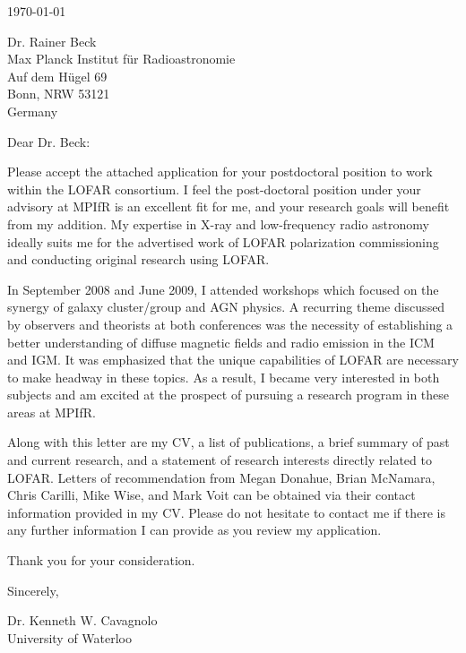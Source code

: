 \documentclass[11pt]{article}
\begin{document}
\today

Dr. Rainer Beck\\
Max Planck Institut f\"ur Radioastronomie\\
Auf dem H\"ugel 69\\
Bonn, NRW 53121\\
Germany

Dear Dr. Beck:

Please accept the attached application for your postdoctoral position
to work within the LOFAR consortium. I feel the post-doctoral position
under your advisory at MPIfR is an excellent fit for me, and your
research goals will benefit from my addition. My expertise in X-ray
and low-frequency radio astronomy ideally suits me for the advertised
work of LOFAR polarization commissioning and conducting original
research using LOFAR.

In September 2008 and June 2009, I attended workshops which focused on
the synergy of galaxy cluster/group and AGN physics. A recurring theme
discussed by observers and theorists at both conferences was the
necessity of establishing a better understanding of diffuse magnetic
fields and radio emission in the ICM and IGM. It was emphasized that
the unique capabilities of LOFAR are necessary to make headway in
these topics. As a result, I became very interested in both subjects
and am excited at the prospect of pursuing a research program in these
areas at MPIfR.

Along with this letter are my CV, a list of publications, a brief
summary of past and current research, and a statement of research
interests directly related to LOFAR. Letters of recommendation from
Megan Donahue, Brian McNamara, Chris Carilli, Mike Wise, and Mark Voit
can be obtained via their contact information provided in my
CV. Please do not hesitate to contact me if there is any further
information I can provide as you review my application.

Thank you for your consideration.

Sincerely,\\
\begin{minipage}{7.5in}
\end{minipage}
Dr. Kenneth W. Cavagnolo\\
University of Waterloo
\end{document}
